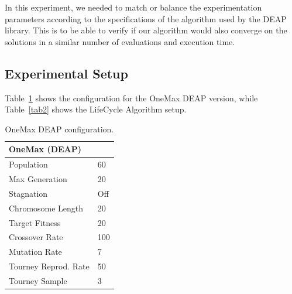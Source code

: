 \documentclass[runningheads]{llncs}
\begin{document}
In this experiment, we needed to match or balance the experimentation
parameters according to the specifications of the algorithm used by the DEAP
library. This is to be able to verify if our algorithm would also converge on
the solutions in a similar number of evaluations and execution time.

\subsection{Experimental Setup}
    Table~\ref{tab1} shows the configuration for the OneMax DEAP version, while Table~\ref{tab2} shows the LifeCycle Algorithm setup.

    \begin{table}[]
        \centering
        \caption{OneMax DEAP configuration.}\label{tab1}
        \begin{tabular}{|l|l|}
        \hline
        \multicolumn{2}{|l|}{OneMax   (DEAP)} \\ \hline
        Population & 60 \\ \hline
        Max   Generation & 20 \\ \hline
        Stagnation & Off \\ \hline
        Chromosome   Length & 20 \\ \hline
        Target   Fitness & 20 \\ \hline
        Crossover   Rate & 100 \\ \hline
        Mutation   Rate & 7 \\ \hline
        Tourney   Reprod. Rate & 50 \\ \hline
        Tourney   Sample & 3 \\ \hline
        \end{tabular}
        \end{table}
    
\end{document}

